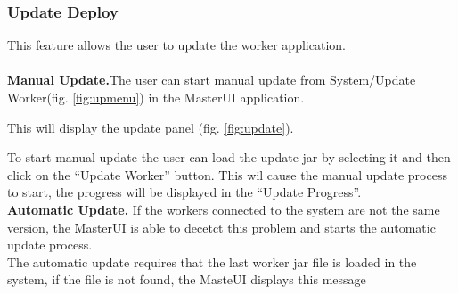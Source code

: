 \documentclass{article}
\begin{document}
\subsubsection{Update Deploy}
This feature allows the user to update the worker application.\\ \\
\textbf{Manual Update.}The user can start manual update from System/Update
Worker(fig.
\ref{fig:upmenu}) in the MasterUI application.
\begin{figure}[h!]
\end{figure}
\newpage
This will display the update panel (fig. \ref{fig:update}).\\
\begin{figure}[h]
\end{figure}
To start manual update the user can load the update jar by selecting it and then
click on the ``Update Worker'' button. This wil cause the manual update process
to start, the progress will be displayed in the ``Update Progress''.\\
\textbf{Automatic Update.} If the workers connected to the system are not the
same version, the MasterUI is able to decetct this problem and starts the
automatic update process.\\
The automatic update requires that the last worker jar file is loaded in the
system, if the file is not found, the MasteUI displays this message
\end{document}
